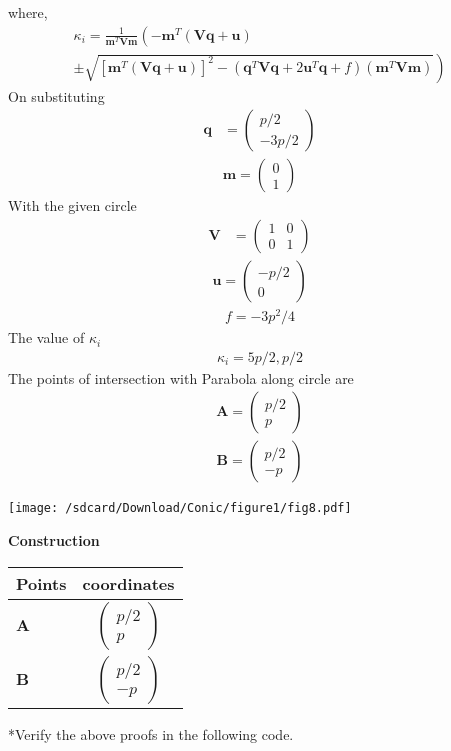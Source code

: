 \documentclass[10pt,a4paper]{report}
\newcommand{\myvec}[1]{\ensuremath{\begin{pmatrix}#1\end{pmatrix}}}
\let\vec\mathbf
\let\vec\mathbf
\providecommand{\brak}[1]{\ensuremath{\left(#1\right)}}
\providecommand{\lbrak}[1]{\ensuremath{\left(#1\right.}}
\providecommand{\rbrak}[1]{\ensuremath{\left.#1\right)}}
\providecommand{\sbrak}[1]{\ensuremath{{}\left[#1\right]}}
\begin{document}
\begin{multicols}{2}
where, \\
{\tiny
\begin{multline}
\kappa_i = \frac{1}
{
\vec{m}^T\vec{V}\vec{m}
}
\lbrak{-\vec{m}^T\brak{\vec{V}\vec{q}+\vec{u}}}
\\
\pm
\rbrak{\sqrt{
\sbrak{
\vec{m}^T\brak{\vec{V}\vec{q}+\vec{u}}
}^2
-
\brak
{
\vec{q}^T\vec{V}\vec{q} + 2\vec{u}^T\vec{q} +f
}
\brak{\vec{m}^T\vec{V}\vec{m}}
}
}
\end{multline}
}
On substituting\\
\begin{align}
\vec{q} &= \myvec{
p/2\\
-3p/2
} 
\end{align}
\begin{align}
\vec{m} = \myvec{0 \\ 1}
\end{align}
With the given circle\\ 
\begin{align}
	\vec{V} &= \myvec{
1 & 0\\
0 & 1
    }
\end{align}
\begin{align}
	\vec{u} = \myvec{-p/2 \\0}
 \end{align}
 \begin{align}
  f = -3p^2/4
 \end{align}
The value of  $\kappa_i$\\
\begin{align}
    \kappa_i = 5p/2,p/2
\end{align}
\vspace{2mm}
The points of intersection with Parabola along circle are \\
\begin{align}
    \vec{A}=\myvec{
p/2\\
p
    }
\end{align}
\begin{align}
    \vec{B}=\myvec{
p/2\\
-p
    }
\end{align}

   \texttt{[image: /sdcard/Download/Conic/figure1/fig8.pdf]}
 

\vspace{2mm} \textbf{Construction}
\begin{center}
\setlength{\arrayrulewidth}{0.5mm}
\setlength{\tabcolsep}{6pt}
\renewcommand{\arraystretch}{1.5}
    \begin{tabular}{|l|c|}
    \hline 
    \textbf{Points} & \textbf{coordinates} \\ \hline
   $\vec{A}$ & $\myvec{
   p/2\\
   p
   } $ \\\hline
   $\vec{B}$ & $\myvec{
   p/2\\
   -p
   } $ \\\hline
      \end{tabular}
  \end{center}

*Verify the above proofs in the following code.\\

 \end{multicols}
\end{document}
